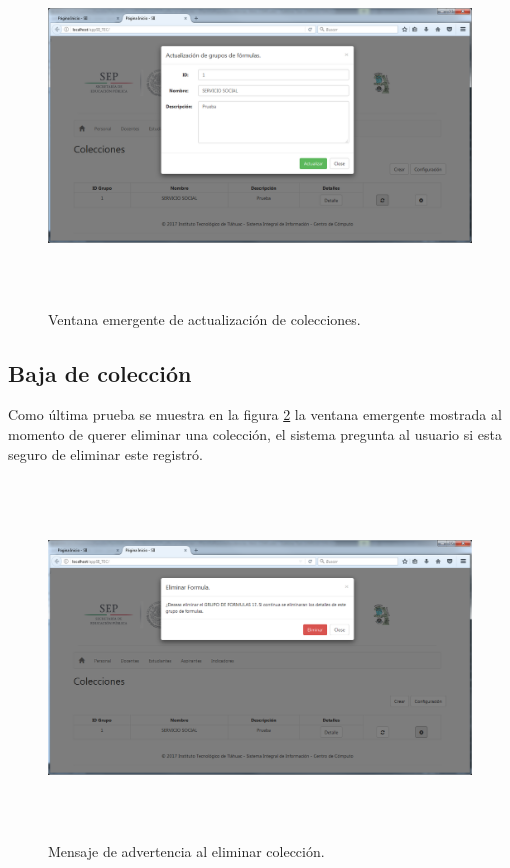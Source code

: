 			\begin{figure}[]
		        \centering
		        \includegraphics[width=16cm, height=9.5cm]{figuras/ColeccionesActualiza}
		        \caption{Ventana emergente de actualizaci\'on de colecciones.}
		        \label{fig_ColeccionesActualiza}
		    \end{figure}

		    \subsection{Baja de colecci\'on}

		    Como \'ultima prueba se muestra en la figura \ref{fig_ColeccionesElimina} la ventana emergente mostrada al momento de querer eliminar una colecci\'on, el sistema pregunta al usuario si esta seguro de eliminar este registr\'o.\\

		    \begin{figure}[]
		        \centering
		        \includegraphics[width=16cm, height=9.5cm]{figuras/ColeccionesElimina}
		        \caption{Mensaje de advertencia al eliminar colecci\'on.}
		        \label{fig_ColeccionesElimina}
		    \end{figure}

